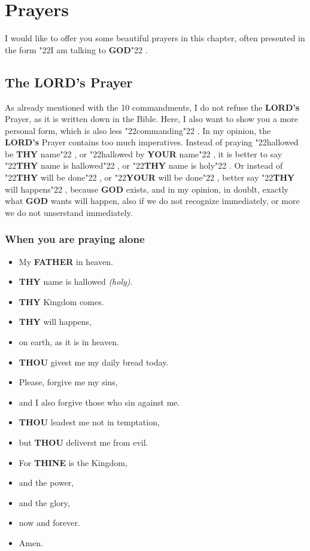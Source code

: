 \documentclass[12pt,a4paper]{article}
\newcommand{\God}[0]{\textbf{GOD}}
\newcommand{\Father}[0]{\textbf{FATHER}}
\newcommand{\Lords}[0]{\textbf{LORD's}}
\newcommand{\Thine}[0]{\textbf{THINE}}
\newcommand{\Thou}[0]{\textbf{THOU}}
\newcommand{\Thy}[0]{\textbf{THY}}
\newcommand{\Your}[0]{\textbf{YOUR}}
\newcommand{\q}[1]{\char"22{#1}\char"22 }
\begin{document}
		\newpage
		\section{Prayers}
			I would like to offer you some beautiful prayers in this chapter,
			often presented in the form \q{I am talking to {\God}}.
	
		\subsection{The {\Lords} Prayer}
			As already mentioned with the 10 commandments,
			I do not refuse the {\Lords} Prayer,
			as it is written down in the Bible.
			Here,
			I also want to show you a more personal form,
			which is also less \q{commanding}.
			In my opinion,
			the {\Lords} Prayer contains too much imperatives.
			Instead of praying \q{hallowed be {\Thy} name},
			or \q{hallowed by {\Your} name},
			it is better to say \q{{\Thy} name is hallowed},
			or \q{{\Thy} name is holy}.
			Or instead of \q{{\Thy} will be done},
			or \q{{\Your} will be done},
			better say \q{{\Thy} will happens},
			because {\God} exists,
			and in my opinion,
			in doublt,
			exactly what {\God} wants will happen,
			also if we do not recognize immediately,
			or more we do not unserstand immediately.
	
		\subsubsection{When you are praying alone}
			\begin{itemize}[nosep]
				\item[]	My {\Father} in heaven.
				\item[]	{\Thy} name is hallowed \textit{(holy)}.
				\item[]	{\Thy} Kingdom comes.
				\item[]	{{\Thy} will happens},
				\item[]	on earth,
						as it is in heaven.
				\item[]	{\Thou} givest me my daily bread today.
				\item[]	Please,
						forgive me my sins,
				\item[]	and I also forgive those who sin against me.
				\item[]	{\Thou} leadest me not in temptation,
				\item[]	but {\Thou} deliverst me from evil.
				\item[]	For {\Thine} is the Kingdom,
				\item[]	and the power,
				\item[]	and the glory,
				\item[]	now and forever.
				\item[]	Amen.
		\end{itemize}
		
\end{document}
